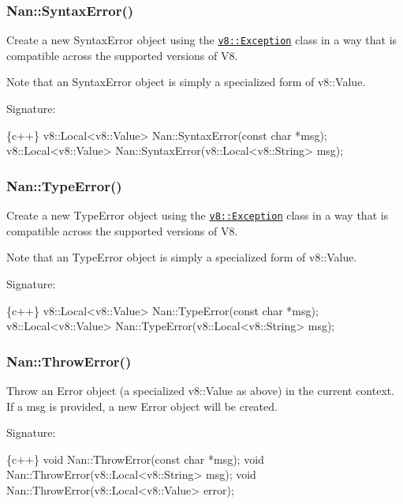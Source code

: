 \label{_api_nan_syntax_error}%
 \subsubsection*{Nan\+::\+Syntax\+Error()}

Create a new Syntax\+Error object using the \href{https://v8docs.nodesource.com/io.js-3.0/da/d6a/classv8_1_1_exception.html}{\tt v8\+::\+Exception} class in a way that is compatible across the supported versions of V8.

Note that an Syntax\+Error object is simply a specialized form of {\ttfamily v8\+::\+Value}.

Signature\+:


\begin{DoxyCode}
\{c++\}
v8::Local<v8::Value> Nan::SyntaxError(const char *msg);
v8::Local<v8::Value> Nan::SyntaxError(v8::Local<v8::String> msg);
\end{DoxyCode}


\label{_api_nan_type_error}%
 \subsubsection*{Nan\+::\+Type\+Error()}

Create a new Type\+Error object using the \href{https://v8docs.nodesource.com/io.js-3.0/da/d6a/classv8_1_1_exception.html}{\tt v8\+::\+Exception} class in a way that is compatible across the supported versions of V8.

Note that an Type\+Error object is simply a specialized form of {\ttfamily v8\+::\+Value}.

Signature\+:


\begin{DoxyCode}
\{c++\}
v8::Local<v8::Value> Nan::TypeError(const char *msg);
v8::Local<v8::Value> Nan::TypeError(v8::Local<v8::String> msg);
\end{DoxyCode}


\label{_api_nan_throw_error}%
 \subsubsection*{Nan\+::\+Throw\+Error()}

Throw an Error object (a specialized {\ttfamily v8\+::\+Value} as above) in the current context. If a {\ttfamily msg} is provided, a new Error object will be created.

Signature\+:


\begin{DoxyCode}
\{c++\}
void Nan::ThrowError(const char *msg);
void Nan::ThrowError(v8::Local<v8::String> msg);
void Nan::ThrowError(v8::Local<v8::Value> error);
\end{DoxyCode}



